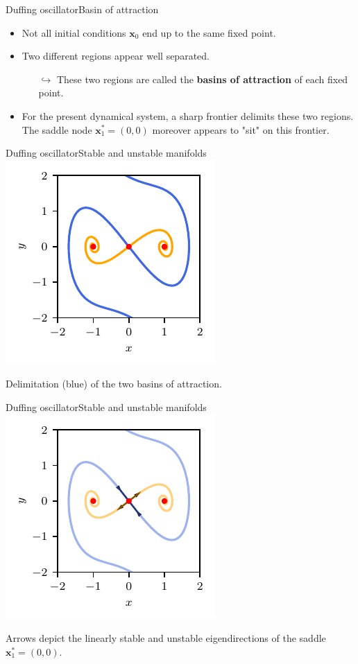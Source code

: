 \documentclass[usenames,dvipsnames,svgnames,10pt,aspectratio=169]{beamer}
\begin{document}
\begin{frame}[t, c]{Duffing oscillator}{Basin of attraction}
	\begin{itemize}
		\item Not all initial conditions ${\bm x}_0$ end up to the same fixed point.

		\bigskip

		\item Two different regions appear well separated.
		\begin{itemize}
			\item[$\hookrightarrow$] These two regions are called the \alert{\textbf{basins of attraction}} of each fixed point.
		\end{itemize}

		\bigskip

		\item For the present dynamical system, a sharp frontier delimits these two regions. The saddle node ${\bm x}^*_1 = (0, 0)$ moreover appears to "sit" on this frontier.
	\end{itemize}

	\vspace{1cm}
\end{frame}

\begin{frame}[t, c]{Duffing oscillator}{Stable and unstable manifolds}
	\centering
	\includegraphics[width=.375\textwidth]{duffing_oscillator_saddle_manifold}

	Delimitation (blue) of the two basins of attraction.

	\vspace{1cm}
\end{frame}

\begin{frame}[t, c]{Duffing oscillator}{Stable and unstable manifolds}
	\centering
	\includegraphics[width=.375\textwidth]{duffing_oscillator_saddle_manifold_bis}

	Arrows depict the linearly stable and unstable eigendirections of the saddle ${\bm x}^*_1 = (0, 0)$.

	\vspace{1cm}
\end{frame}
\end{document}
